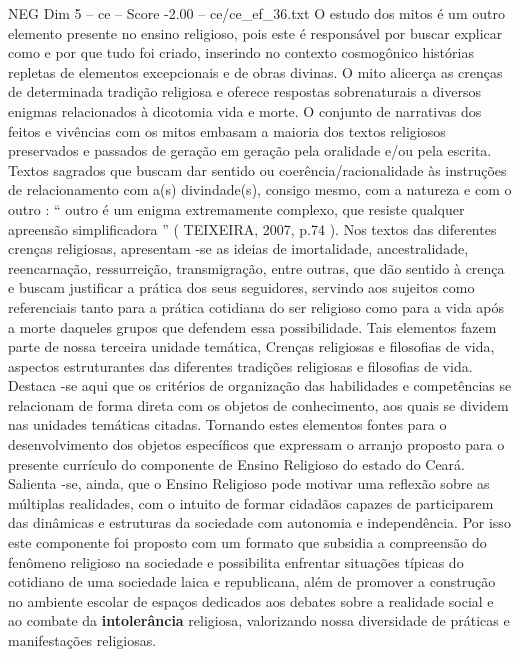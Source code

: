 \begin{textsample}{NEG Dim 5 – ce – Score -2.00 – ce/ce\_ef\_36.txt}
O estudo dos mitos é um outro elemento presente no ensino religioso, pois este é responsável por buscar explicar como e por que tudo foi criado, inserindo no contexto cosmogônico histórias repletas de elementos excepcionais e de obras divinas.
O mito alicerça as crenças de determinada tradição religiosa e oferece respostas sobrenaturais a diversos enigmas relacionados à dicotomia vida e morte.
O conjunto de narrativas dos feitos e vivências com os mitos embasam a maioria dos textos religiosos preservados e passados de geração em geração pela oralidade e/ou pela escrita.
Textos sagrados que buscam dar sentido ou coerência/racionalidade às instruções de relacionamento com a(s) divindade(s), consigo mesmo, com a natureza e com o outro : “ outro é um enigma extremamente complexo, que resiste qualquer apreensão simplificadora ” ( TEIXEIRA, 2007, p.74 ).
Nos textos das diferentes crenças religiosas, apresentam -se as ideias de imortalidade, ancestralidade, reencarnação, ressurreição, transmigração, entre outras, que dão sentido à crença e buscam justificar a prática dos seus seguidores, servindo aos sujeitos como referenciais tanto para a prática cotidiana do ser religioso como para a vida após a morte daqueles grupos que defendem essa possibilidade.
Tais elementos fazem parte de nossa terceira unidade temática, Crenças religiosas e filosofias de vida, aspectos estruturantes das diferentes tradições religiosas e filosofias de vida.
Destaca -se aqui que os critérios de organização das habilidades e competências se relacionam de forma direta com os objetos de conhecimento, aos quais se dividem nas unidades temáticas citadas.
Tornando estes elementos fontes para o desenvolvimento dos objetos específicos que expressam o arranjo proposto para o presente currículo do componente de Ensino Religioso do estado do Ceará.
Salienta -se, ainda, que o Ensino Religioso pode motivar uma reflexão sobre as múltiplas realidades, com o intuito de formar cidadãos capazes de participarem das dinâmicas e estruturas da sociedade com autonomia e independência.
Por isso este componente foi proposto com um formato que subsidia a compreensão do fenômeno religioso na sociedade e possibilita enfrentar situações típicas do cotidiano de uma sociedade laica e republicana, além de promover a construção no ambiente escolar de espaços dedicados aos debates sobre a realidade social e ao combate da \textbf{intolerância} religiosa, valorizando nossa diversidade de práticas e manifestações religiosas.

\end{textsample}
